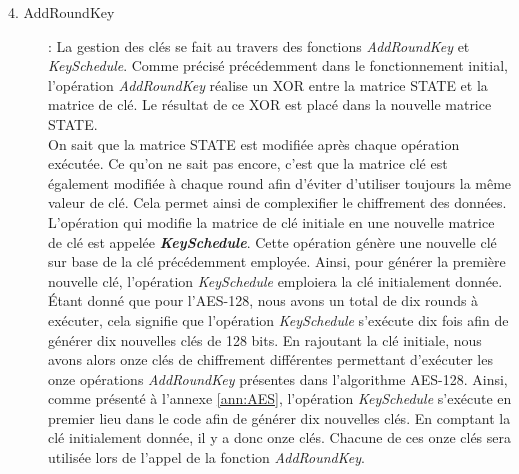 \documentclass[10pt, oneside, a4paper]{article}
\begin{document}
\begin{description}
\item[4. AddRoundKey] : La gestion des clés se fait au travers des fonctions \textit{AddRoundKey} et \textit{KeySchedule}. Comme précisé précédemment dans le fonctionnement initial, l'opération \textit{AddRoundKey} réalise un XOR entre la matrice STATE et la matrice de clé. Le résultat de ce XOR est placé dans la nouvelle matrice STATE.\\ 
On sait que la matrice STATE est modifiée après chaque opération exécutée. Ce qu'on ne sait pas encore, c'est que la matrice clé est également modifiée à chaque round afin d'éviter d'utiliser toujours la même valeur de clé. Cela permet ainsi de complexifier le chiffrement des données. L'opération qui modifie la matrice de clé initiale en une nouvelle matrice de clé est appelée \textbf{\textit{KeySchedule}}. Cette opération génère une nouvelle clé sur base de la clé précédemment employée. Ainsi, pour générer la première nouvelle clé, l'opération \textit{KeySchedule} emploiera la clé initialement donnée. Étant donné que pour l'AES-128, nous avons un total de dix rounds à exécuter, cela signifie que l'opération \textit{KeySchedule} s'exécute dix fois afin de générer dix nouvelles clés de 128 bits. En rajoutant la clé initiale, nous avons alors onze clés de chiffrement différentes permettant d'exécuter les onze opérations \textit{AddRoundKey} présentes dans l'algorithme AES-128. Ainsi, comme présenté à l'annexe \ref{ann:AES}, l'opération \textit{KeySchedule} s'exécute en premier lieu dans le code afin de générer dix nouvelles clés. En comptant la clé initialement donnée, il y a donc onze clés. Chacune de ces onze clés sera utilisée lors de l'appel de la fonction \textit{AddRoundKey}.\\ 


\end{description}
\end{document}
